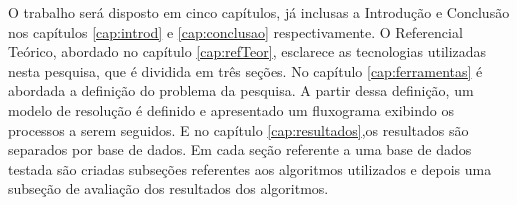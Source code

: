 O trabalho será disposto em cinco capítulos, já inclusas a Introdução e Conclusão nos capítulos \ref{cap:introd} e \ref{cap:conclusao} respectivamente. O Referencial Teórico, abordado no capítulo \ref{cap:refTeor}, esclarece as tecnologias utilizadas nesta pesquisa, que é dividida em três seções. No capítulo \ref{cap:ferramentas} é abordada a definição do problema da pesquisa. A partir dessa definição, um modelo de resolução é definido e apresentado um fluxograma exibindo os processos a serem seguidos. E  no capítulo \ref{cap:resultados},os resultados são separados por base de dados. Em cada seção referente a uma base de dados testada são criadas subseções referentes aos algoritmos utilizados  e depois uma subseção de avaliação dos resultados dos algoritmos.





